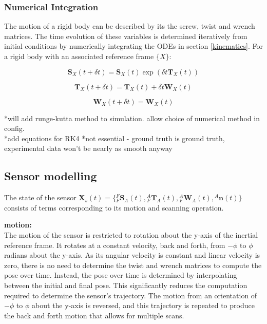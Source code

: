 \subsubsection{Numerical Integration}
	
The motion of a rigid body can be described by its the screw, twist and wrench matrices. The time evolution of these variables is determined iteratively from initial conditions by numerically integrating the ODEs in section \ref{kinematics}. For a rigid body with an associated reference frame $\{X\}$:

\begin{equation}
	\mathbf{S}_X(t+\delta t) = \mathbf{S}_X(t)\exp({\delta t {\mathbf{T}_X(t)}})
\end{equation}

\begin{equation}
	\mathbf{T}_X(t+\delta t) = \mathbf{T}_X(t) + \delta t \mathbf{W}_X(t)
\end{equation}

\begin{equation}
	\mathbf{W}_X(t+\delta t) =\mathbf{W}_X(t)
\end{equation}

*will add runge-kutta method to simulation. allow choice of numerical method in config.\\
*add equations for RK4 
*not essential - ground truth is ground truth, experimental data won't be nearly as smooth anyway

\subsection{Sensor modelling}
The state of the sensor 
$\mathbf{X}_{s}(t) = 
	\{{^{F}_{F}\mathbf{S}^{}_{A}(t)},{^{A}_{F}\mathbf{T}^{}_{A}(t)},{^{A}_{F}\mathbf{W}^{}_{A}(t)},
	{^{A}\mathbf{n}(t)}\}$
consists of terms corresponding to its motion and scanning operation. 

\textbf{motion:}\\
The motion of the sensor is restricted to rotation about the y-axis of the inertial reference frame. It rotates at a constant velocity, back and forth, from $-\phi$ to $\phi$ radians about the y-axis.  As its angular velocity is constant and linear velocity is zero, there is no need to determine the twist and wrench matrices to compute the pose over time. Instead, the pose over time is determined by interpolating between the initial and final pose. This significantly reduces the computation required to determine the sensor's trajectory. The motion from an orientation of $-\phi$ to $\phi$ about the y-axis is reversed, and this trajectory is repeated to produce the back and forth motion that allows for multiple scans.

